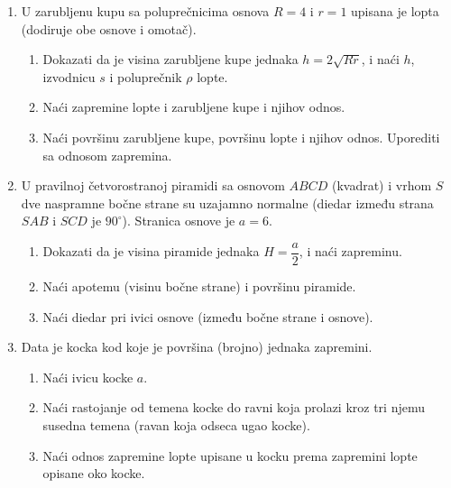 \begin{enumerate}[label=\arabic*.]
\item U zarubljenu kupu sa poluprečnicima osnova $R=4$ i $r=1$ upisana je lopta (dodiruje obe osnove i omotač).
\begin{enumerate}[label=\alph*)]
\item Dokazati da je visina zarubljene kupe jednaka $h=2\sqrt{Rr}$, i naći $h$, izvodnicu $s$ i poluprečnik $\rho$ lopte.
\item Naći zapremine lopte i zarubljene kupe i njihov odnos.
\item Naći površinu zarubljene kupe, površinu lopte i njihov odnos. Uporediti sa odnosom zapremina.
\end{enumerate}

\item U pravilnoj četvorostranoj piramidi sa osnovom $ABCD$ (kvadrat) i vrhom $S$ dve naspramne bočne strane su uzajamno normalne (diedar između strana $SAB$ i $SCD$ je $90^\circ$). Stranica osnove je $a=6$.
\begin{enumerate}[label=\alph*)]
\item Dokazati da je visina piramide jednaka $H=\dfrac{a}{2}$, i naći zapreminu.
\item Naći apotemu (visinu bočne strane) i površinu piramide.
\item Naći diedar pri ivici osnove (između bočne strane i osnove).
\end{enumerate}

\item Data je kocka kod koje je površina (brojno) jednaka zapremini.
\begin{enumerate}[label=\alph*)]
\item Naći ivicu kocke $a$.
\item Naći rastojanje od temena kocke do ravni koja prolazi kroz tri njemu susedna temena (ravan koja odseca ugao kocke).
\item Naći odnos zapremine lopte upisane u kocku prema zapremini lopte opisane oko kocke.
\end{enumerate}
\end{enumerate}
\clearpage
